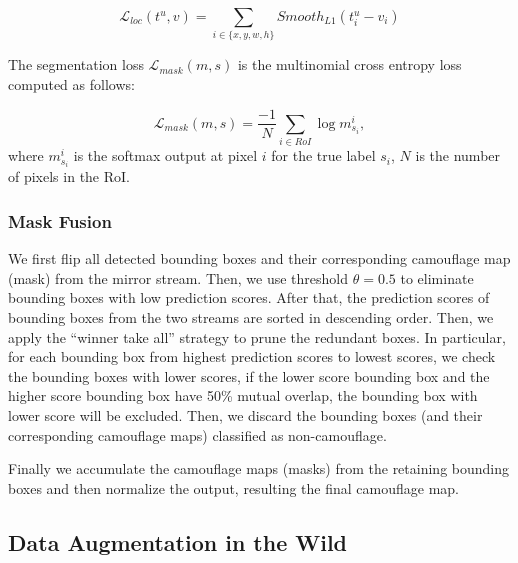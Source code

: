 \documentclass[journal]{IEEEtran}
\begin{document}
\begin{equation}
\mathcal{L}_{loc}(t^u, v) = \sum_{i \in \{x,y,w,h\}} Smooth_{L1}(t^u_i-v_i)
\end{equation}

The segmentation loss $\mathcal{L}_{mask}(m, s)$ is the multinomial cross entropy loss computed as follows:

\begin{equation}
\mathcal{L}_{mask}(m,s) = \frac{-1}{N}\sum_{i \in RoI}{\log{m^i_{s_i}}},
\end{equation}
where $m^i_{s_i}$ is the softmax output at pixel $i$ for the true label $s_i$, $N$ is the number of pixels in the RoI.

\subsubsection{Mask Fusion} 

We first flip all detected bounding boxes and their corresponding camouflage map (mask) from the mirror stream. Then, we use threshold $\theta=0.5$ to eliminate bounding boxes with low prediction scores. After that, the prediction scores of bounding boxes from the two streams are sorted in descending order. Then, we apply the ``winner take all'' strategy to prune the redundant boxes. In particular, for each bounding box from highest prediction scores to lowest scores, we check the  bounding boxes with lower scores, if the lower score bounding box and the higher score bounding box have 50\% mutual overlap, the bounding box with lower score will be excluded. Then, we discard the bounding boxes (and their corresponding camouflage maps) classified as non-camouflage.  



Finally we accumulate the camouflage maps (masks) from the retaining bounding boxes and then normalize the output, resulting the final camouflage map.



















\subsection{Data Augmentation in the Wild}
\end{document}
